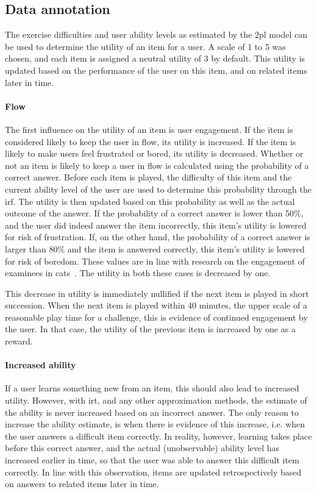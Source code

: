 \subsection{Data annotation}
\label{sec:utility}
The exercise difficulties and user ability levels as estimated by the \gls{2pl} model can be used to determine the utility of an item for a user.
A scale of 1 to 5 was chosen, and each item is assigned a neutral utility of 3 by default.
This utility is updated based on the performance of the user on this item, and on related items later in time.

\paragraph{Flow}
The first influence on the utility of an item is user engagement.
If the item is considered likely to keep the user in flow, its utility is increased.
If the item is likely to make users feel frustrated or bored, its utility is decreased.
Whether or not an item is likely to keep a user in flow is calculated using the probability of a correct answer.
Before each item is played, the difficulty of this item and the current ability level of the user are used to determine this probability through the \gls{irf}.
The utility is then updated based on this probability as well as the actual outcome of the answer.
If the probability of a correct answer is lower than 50\%, and the user did indeed answer the item incorrectly, this item's utility is lowered for risk of frustration.
If, on the other hand, the probability of a correct answer is larger than 80\% and the item is answered correctly, this item's utility is lowered for risk of boredom.
These values are in line with research on the engagement of examinees in \glspl{cat}~\cite{ling2017computerized,bolton1976handbook,moeyaert2016easy}.
The utility in both these cases is decreased by one.

This decrease in utility is immediately nullified if the next item is played in short succession.
When the next item is played within 40 minutes, the upper scale of a reasonable play time for a challenge, this is evidence of continued engagement by the user.
In that case, the utility of the previous item is increased by one as a reward.

\paragraph{Increased ability}
If a user learns something new from an item, this should also lead to increased utility.
However, with \gls{irt}, and any other approximation methods, the estimate of the ability is never increased based on an incorrect answer.
The only reason to increase the ability estimate, is when there is evidence of this increase, i.e. when the user answers a difficult item correctly.
In reality, however, learning takes place before this correct answer, and the actual (unobservable) ability level has increased earlier in time, so that the user was able to answer this difficult item correctly.
In line with this observation, items are updated retrospectively based on answers to related items later in time.

